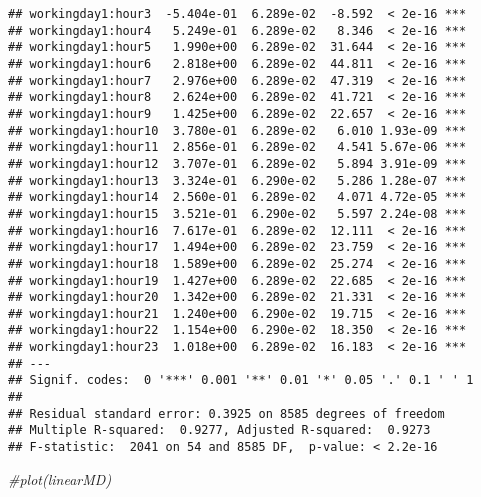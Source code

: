 \documentclass[]{article}
\newenvironment{Shaded}{\begin{snugshade}}{\end{snugshade}}
\newcommand{\KeywordTok}[1]{\textcolor[rgb]{0.13,0.29,0.53}{\textbf{#1}}}
\newcommand{\StringTok}[1]{\textcolor[rgb]{0.31,0.60,0.02}{#1}}
\newcommand{\CommentTok}[1]{\textcolor[rgb]{0.56,0.35,0.01}{\textit{#1}}}
\newcommand{\OperatorTok}[1]{\textcolor[rgb]{0.81,0.36,0.00}{\textbf{#1}}}
\newcommand{\NormalTok}[1]{#1}
\begin{document}
\begin{verbatim}
## workingday1:hour3  -5.404e-01  6.289e-02  -8.592  < 2e-16 ***
## workingday1:hour4   5.249e-01  6.289e-02   8.346  < 2e-16 ***
## workingday1:hour5   1.990e+00  6.289e-02  31.644  < 2e-16 ***
## workingday1:hour6   2.818e+00  6.289e-02  44.811  < 2e-16 ***
## workingday1:hour7   2.976e+00  6.289e-02  47.319  < 2e-16 ***
## workingday1:hour8   2.624e+00  6.289e-02  41.721  < 2e-16 ***
## workingday1:hour9   1.425e+00  6.289e-02  22.657  < 2e-16 ***
## workingday1:hour10  3.780e-01  6.289e-02   6.010 1.93e-09 ***
## workingday1:hour11  2.856e-01  6.289e-02   4.541 5.67e-06 ***
## workingday1:hour12  3.707e-01  6.289e-02   5.894 3.91e-09 ***
## workingday1:hour13  3.324e-01  6.290e-02   5.286 1.28e-07 ***
## workingday1:hour14  2.560e-01  6.289e-02   4.071 4.72e-05 ***
## workingday1:hour15  3.521e-01  6.290e-02   5.597 2.24e-08 ***
## workingday1:hour16  7.617e-01  6.289e-02  12.111  < 2e-16 ***
## workingday1:hour17  1.494e+00  6.289e-02  23.759  < 2e-16 ***
## workingday1:hour18  1.589e+00  6.289e-02  25.274  < 2e-16 ***
## workingday1:hour19  1.427e+00  6.289e-02  22.685  < 2e-16 ***
## workingday1:hour20  1.342e+00  6.289e-02  21.331  < 2e-16 ***
## workingday1:hour21  1.240e+00  6.290e-02  19.715  < 2e-16 ***
## workingday1:hour22  1.154e+00  6.290e-02  18.350  < 2e-16 ***
## workingday1:hour23  1.018e+00  6.289e-02  16.183  < 2e-16 ***
## ---
## Signif. codes:  0 '***' 0.001 '**' 0.01 '*' 0.05 '.' 0.1 ' ' 1
## 
## Residual standard error: 0.3925 on 8585 degrees of freedom
## Multiple R-squared:  0.9277, Adjusted R-squared:  0.9273 
## F-statistic:  2041 on 54 and 8585 DF,  p-value: < 2.2e-16
\end{verbatim}

\begin{Shaded}
\begin{Highlighting}[]
\CommentTok{#plot(linearMD)}
\end{Highlighting}
\end{Shaded}

\begin{Shaded}
\end{Shaded}
\end{document}
